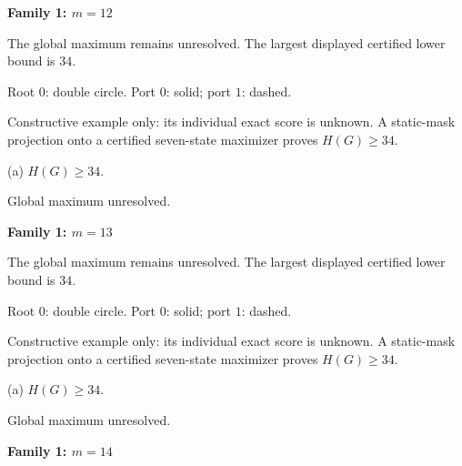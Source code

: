 \documentclass[10pt,a4paper]{article}
\begin{document}
\clearpage
{\Large\bfseries Family 1: $m=12$}\par
\vspace{2mm}
{\small The global maximum remains unresolved. The largest displayed certified lower bound is $34$.}\par
\vspace{1mm}
{\small Root $0$: double circle. Port $0$: solid; port $1$: dashed.}\par
\vspace{3mm}
{\small Constructive example only: its individual exact score is unknown. A static-mask projection onto a certified seven-state maximizer proves $H(G)\ge34$.}\par\vspace{2mm}
\noindent\hfill
\begin{minipage}[t]{.96\textwidth}\centering
\resizebox{14cm}{!}{}\par
{\footnotesize (a) $H(G)\ge 34$.\par Global maximum unresolved.}\par
\end{minipage}\hfill
\par\vspace{2.5mm}
\clearpage
{\Large\bfseries Family 1: $m=13$}\par
\vspace{2mm}
{\small The global maximum remains unresolved. The largest displayed certified lower bound is $34$.}\par
\vspace{1mm}
{\small Root $0$: double circle. Port $0$: solid; port $1$: dashed.}\par
\vspace{3mm}
{\small Constructive example only: its individual exact score is unknown. A static-mask projection onto a certified seven-state maximizer proves $H(G)\ge34$.}\par\vspace{2mm}
\noindent\hfill
\begin{minipage}[t]{.96\textwidth}\centering
\resizebox{14cm}{!}{}\par
{\footnotesize (a) $H(G)\ge 34$.\par Global maximum unresolved.}\par
\end{minipage}\hfill
\par\vspace{2.5mm}
\clearpage
{\Large\bfseries Family 1: $m=14$}\par
\end{document}
